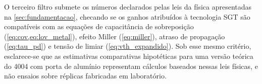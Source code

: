 O terceiro filtro submete os números declarados pelas leis da física apresentadas na \cref{sec:fundamentacao}, checando se os ganhos atribuídos à tecnologia SGT são compatíveis com as equações de capacitância de sobreposição (\cref{eq:cov,eq:lov_metal}), efeito Miller (\cref{eq:miller}), atraso de propagação (\cref{eq:tau_pd}) e tensão de limiar (\cref{eq:vth_expandido}). Sob esse mesmo critério, esclarece-se que as estimativas comparativas hipotéticas para uma versão teórica do 4004 com porta de alumínio representam cálculos baseados nessas leis físicas, e não ensaios sobre réplicas fabricadas em laboratório.